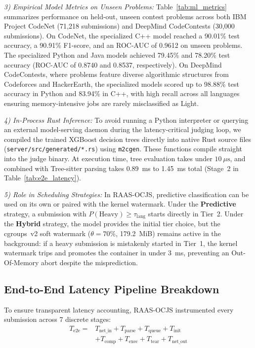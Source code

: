 \documentclass[conference]{IEEEtran}
\begin{document}
\textit{3) Empirical Model Metrics on Unseen Problems:}
Table~\ref{tab:ml_metrics} summarizes performance on held-out, unseen contest problems across both IBM Project CodeNet (71,218 submissions) and DeepMind CodeContests (30,000 submissions). On CodeNet, the specialized C++ model reached a 90.01\% test accuracy, a 90.91\% F1-score, and an ROC-AUC of 0.9612 on unseen problems. The specialized Python and Java models achieved 79.45\% and 78.20\% test accuracy (ROC-AUC of 0.8740 and 0.8537, respectively). On DeepMind CodeContests, where problems feature diverse algorithmic structures from Codeforces and HackerEarth, the specialized models scored up to 98.88\% test accuracy in Python and 83.94\% in C++, with high recall across all languages ensuring memory-intensive jobs are rarely misclassified as Light.

\textit{4) In-Process Rust Inference:}
To avoid running a Python interpreter or querying an external model-serving daemon during the latency-critical judging loop, we compiled the trained XGBoost decision trees directly into native Rust source files (\texttt{server/src/generated/*.rs}) using \texttt{m2cgen}. These functions compile straight into the judge binary. At execution time, tree evaluation takes under $10\ \mu\text{s}$, and combined with Tree-sitter parsing takes 0.89~ms to 1.45~ms total (Stage~2 in Table~\ref{tab:e2e_latency}).

\textit{5) Role in Scheduling Strategies:}
In RAAS-OCJS, predictive classification can be used on its own or paired with the kernel watermark. Under the \textbf{Predictive} strategy, a submission with $P(\mathrm{Heavy}) \ge \tau_{\mathrm{lang}}$ starts directly in Tier~2. Under the \textbf{Hybrid} strategy, the model provides the initial tier choice, but the cgroups~v2 soft watermark ($\theta = 70\%$, 179.2~MiB) remains active in the background: if a heavy submission is mistakenly started in Tier~1, the kernel watermark trips and promotes the container in under 3~ms, preventing an Out-Of-Memory abort despite the misprediction.

\subsection{End-to-End Latency Pipeline Breakdown}
To ensure transparent latency accounting, RAAS-OCJS instrumented every submission across 7 discrete stages:
\begin{equation}
\begin{aligned}
T_{\mathrm{e2e}} ={}&
T_{\mathrm{net\_in}} + T_{\mathrm{parse}} +
T_{\mathrm{queue}} + T_{\mathrm{init}} \\
&+ T_{\mathrm{comp}} + T_{\mathrm{exec}} +
T_{\mathrm{tear}} + T_{\mathrm{net\_out}}
\end{aligned}
\end{equation}
\end{document}

